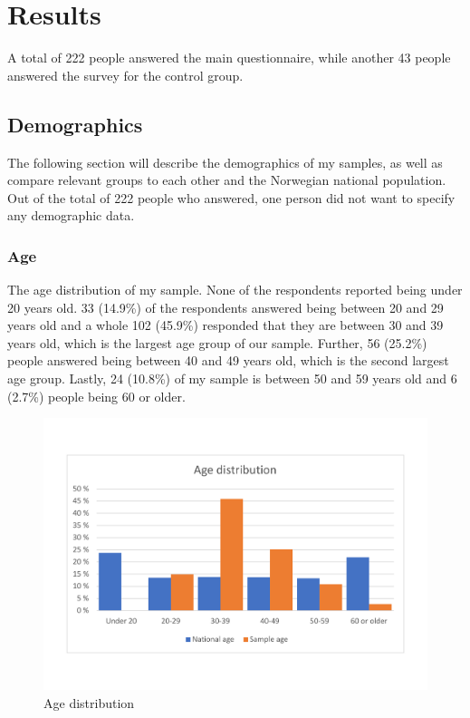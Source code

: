 \chapter{Results}
\label{results}
A total of 222 people answered the main questionnaire, while another 43 people answered the survey for the control group. 

\section{Demographics}

The following section will describe the demographics of my samples, as well as compare relevant groups to each other and the Norwegian national population. Out of the total of 222 people who answered, one person did not want to specify any demographic data. 

\subsection{Age}
The age distribution of my sample. None of the respondents reported being under 20 years old. 33 (14.9\%) of the respondents answered being between 20 and 29 years old and a whole 102 (45.9\%) responded that they are between 30 and 39 years old, which is the largest age group of our sample. Further, 56 (25.2\%) people answered being between 40 and 49 years old, which is the second largest age group. Lastly, 24 (10.8\%) of my sample is between 50 and 59 years old and 6 (2.7\%) people being 60 or older. 

\begin{figure}[H]
    \centering
    \includegraphics[scale=0.45]{figures/diagrams/age_ssb.pdf}
    \caption{Age distribution}
    \label{fig:age}
\end{figure}

